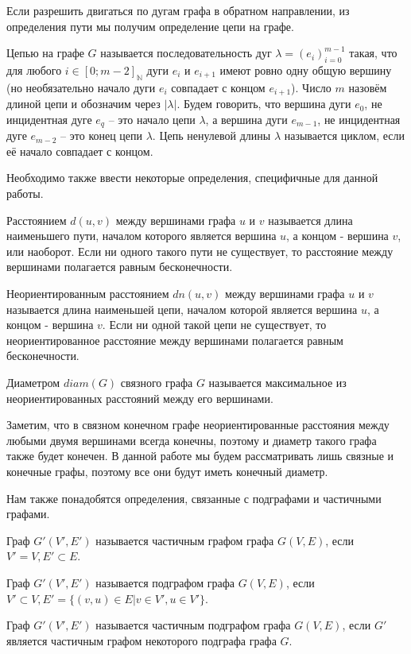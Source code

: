 Если разрешить двигаться по дугам графа в обратном направлении, из определения пути мы получим определение цепи на графе.

\begin{defn}
	Цепью на графе $G$ называется последовательность дуг $\lambda = (e_i)_{i = 0}^{m-1}$ такая, что для любого $i \in [0;m-2]_\mathbb{N}$ дуги $e_i$ и $e_{i+1}$ имеют ровно одну общую вершину (но необязательно начало дуги $e_i$ совпадает с концом $e_{i+1}$). Число $m$ назовём длиной цепи и обозначим через $|\lambda|$. Будем говорить, что вершина дуги $e_0$, не инцидентная дуге $e_q$ -- это начало цепи $\lambda$, а вершина дуги $e_{m-1}$, не инцидентная дуге $e_{m-2}$ -- это конец цепи $\lambda$. Цепь ненулевой длины $\lambda$ называется циклом, если её начало совпадает с концом.
\end{defn} 

Необходимо также ввести некоторые определения, специфичные для данной работы.

\begin{defn}
	Расстоянием $d(u, v)$ между вершинами графа $u$ и $v$ называется длина наименьшего пути, началом которого является вершина $u$, а концом - вершина $v$, или наоборот. Если ни одного такого пути не существует, то расстояние между вершинами полагается равным бесконечности.
\end{defn}

\begin{defn}
	Неориентированным расстоянием $dn(u, v)$ между вершинами графа $u$ и $v$ называется длина наименьшей цепи, началом которой является вершина $u$, а концом - вершина $v$. Если ни одной такой цепи не существует, то неориентированное расстояние между вершинами полагается равным бесконечности.
\end{defn}

\begin{defn}
	Диаметром $diam(G)$ связного графа $G$ называется максимальное из неориентированных расстояний между его вершинами.
\end{defn}

Заметим, что в связном конечном графе неориентированные расстояния между любыми двумя вершинами всегда конечны, поэтому и диаметр такого графа также будет конечен. В данной работе мы будем рассматривать лишь связные и конечные графы, поэтому все они будут иметь конечный диаметр.

Нам также понадобятся определения, связанные с подграфами и частичными графами.

\begin{defn}
	 Граф $G'(V', E')$ называется частичным графом графа $G(V, E)$, если $V' = V, E' \subset E$.
\end{defn}

\begin{defn}
	Граф $G'(V', E')$ называется подграфом графа $G(V, E)$, если $V' \subset V, E' = \{(v, u) \in E | v \in V', u \in V'\}$.
\end{defn}

\begin{defn}
	Граф $G'(V', E')$ называется частичным подграфом графа $G(V, E)$, если $G'$ является частичным графом некоторого подграфа графа $G$.
\end{defn}